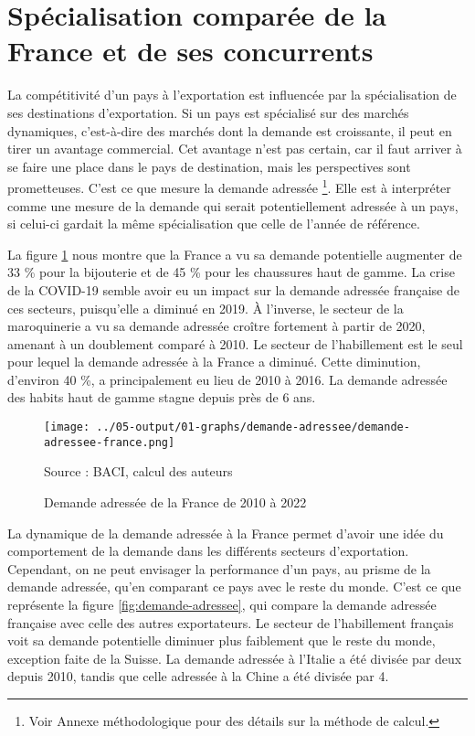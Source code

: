 \documentclass[french,10pt,a4paper]{article}
\begin{document}
\newpage
{}

\section{Spécialisation comparée de la France et de ses concurrents}


La compétitivité d'un pays à l'exportation est influencée par la spécialisation de ses destinations d'exportation. Si un pays est spécialisé sur des marchés dynamiques, c'est-à-dire des marchés dont la demande est croissante, il peut en tirer un avantage commercial. Cet avantage n'est pas certain, car il faut arriver à se faire une place dans le pays de destination, mais les perspectives sont prometteuses. C'est ce que mesure la demande adressée \footnote{Voir Annexe méthodologique pour des détails sur la méthode de calcul.}. Elle est à interpréter comme une mesure de la demande qui serait potentiellement adressée à un pays, si celui-ci gardait la même spécialisation que celle de l'année de référence.

La figure \ref{fig:demande-adressee-france} nous montre que la France a vu sa demande potentielle augmenter de 33 \% pour la bijouterie et de 45 \% pour les chaussures haut de gamme. La crise de la COVID-19 semble avoir eu un impact sur la demande adressée française de ces secteurs, puisqu'elle a diminué en 2019. À l'inverse, le secteur de la maroquinerie a vu sa demande adressée croître fortement à partir de 2020, amenant à un doublement comparé à 2010. Le secteur de l'habillement est le seul pour lequel la demande adressée à la France a diminué. Cette diminution, d'environ 40 \%, a principalement eu lieu de 2010 à 2016. La demande adressée des habits haut de gamme stagne depuis près de 6 ans.

\begin{figure}[!h]
  \centering  \texttt{[image: ../05-output/01-graphs/demande-adressee/demande-adressee-france.png]}
  \captionsetup{justification=raggedright,singlelinecheck=false, font=small}
  \caption*{Source : BACI, calcul des auteurs}
  \captionsetup{justification=centering, singlelinecheck=true, font=normalsize}
  \caption{Demande adressée de la France de 2010 à 2022}
  \label{fig:demande-adressee-france}
\end{figure}

La dynamique de la demande adressée à la France permet d'avoir une idée du comportement de la demande dans les différents secteurs d'exportation. Cependant, on ne peut envisager la performance d'un pays, au prisme de la demande adressée, qu'en comparant ce pays avec le reste du monde. C'est ce que représente la figure \ref{fig:demande-adressee}, qui compare la demande adressée française avec celle des autres exportateurs. Le secteur de l'habillement français voit sa demande potentielle diminuer plus faiblement que le reste du monde, exception faite de la Suisse. La demande adressée à l'Italie a été divisée par deux depuis 2010, tandis que celle adressée à la Chine a été divisée par 4.
\end{document}
